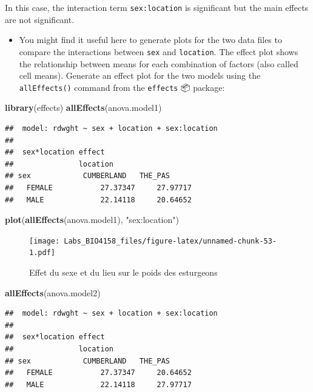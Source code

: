 \documentclass[
  12pt,
]{book}
\newenvironment{Shaded}{\begin{snugshade}}{\end{snugshade}}
\newcommand{\KeywordTok}[1]{\textcolor[rgb]{0.13,0.29,0.53}{\textbf{#1}}}
\newcommand{\NormalTok}[1]{#1}
\newcommand{\StringTok}[1]{\textcolor[rgb]{0.31,0.60,0.02}{#1}}
\providecommand{\tightlist}{%
  \setlength{\itemsep}{0pt}\setlength{\parskip}{0pt}}
\begin{document}
In this case, the interaction term \texttt{sex:location} is significant but the main effects are not significant.

\begin{itemize}
\tightlist
\item
  You might find it useful here to generate plots for the two data files to compare the interactions between \texttt{sex} and \texttt{location}. The effect plot shows the relationship between means for each combination of factors (also called cell means). Generate an effect plot for the two models using the \texttt{allEffects()} command from the \texttt{effects} 📦 package:
\end{itemize}

\begin{Shaded}
\begin{Highlighting}[]
\KeywordTok{library}\NormalTok{(effects)}
\KeywordTok{allEffects}\NormalTok{(anova.model1)}
\end{Highlighting}
\end{Shaded}

\begin{verbatim}
##  model: rdwght ~ sex + location + sex:location
## 
##  sex*location effect
##               location
## sex            CUMBERLAND   THE_PAS     
##   FEMALE           27.37347     27.97717
##   MALE             22.14118     20.64652
\end{verbatim}

\begin{Shaded}
\begin{Highlighting}[]
\KeywordTok{plot}\NormalTok{(}\KeywordTok{allEffects}\NormalTok{(anova.model1), }\StringTok{"sex:location"}\NormalTok{)}
\end{Highlighting}
\end{Shaded}

\begin{figure}
\centering
\texttt{[image: Labs\_BIO4158\_files/figure-latex/unnamed-chunk-53-1.pdf]}
\caption{\label{fig:unnamed-chunk-53}Effet du sexe et du lieu sur le poids des esturgeons}
\end{figure}

\begin{Shaded}
\begin{Highlighting}[]
\KeywordTok{allEffects}\NormalTok{(anova.model2)}
\end{Highlighting}
\end{Shaded}

\begin{verbatim}
##  model: rdwght ~ sex + location + sex:location
## 
##  sex*location effect
##               location
## sex            CUMBERLAND   THE_PAS     
##   FEMALE           27.37347     20.64652
##   MALE             22.14118     27.97717
\end{verbatim}
\end{document}
